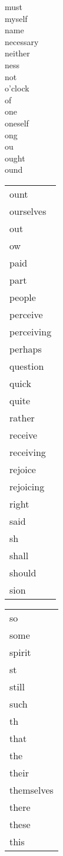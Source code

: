 \documentclass[draft]{article}
\makeatletter
\newcommand{\mytaglist}[1]{%
    \enskip\begin{tabular}[t]{@{}l@{}}
    #1
    \end{tabular}\enskip}
\makeatother
\begin{document}
\begin{center}
{must \\
myself \\
name \\
necessary \\
neither \\
ness \\
not \\
o'clock \\
of \\
one \\
oneself \\
ong \\
ou \\
ought \\
ound \\
}
\mytaglist{
ount \\
ourselves \\
out \\
ow \\
paid \\
part \\
people \\
perceive \\
perceiving \\
perhaps \\
question \\
quick \\
quite \\
rather \\
receive \\
receiving \\
rejoice \\
rejoicing \\
right \\
said \\
sh \\
shall \\
should \\
sion \\
}
\mytaglist{
so \\
some \\
spirit \\
st \\
still \\
such \\
th \\
that \\
the \\
their \\
themselves \\
there \\
these \\
this \\
}
\end{center}
\end{document}
